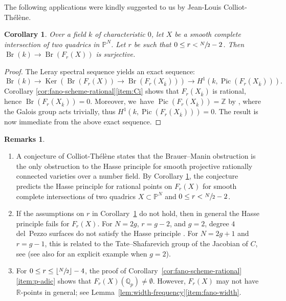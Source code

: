 \documentclass[JEP,XML,SOM,Unicode,NoEqCountersInSection,published]{cedram}
\let\bb\mathbb\let\Bbb\mathbb
\theoremstyle{plain}
\newtheorem{cor}[thm]{Corollary}
\theoremstyle{definition}
\newtheorem{rems}[thm]{Remarks}
\DeclareMathOperator{\Br}{Br}
\DeclareMathOperator\Ker{Ker}
\DeclareMathOperator{\Pic}{Pic}
\newcommand{\kbar}{{\overline{k}}}
\renewcommand\P{\mathbb{P}}
\newcommand\Z{\mathbb{Z}}
\begin{document}
The following applications were kindly suggested to us by Jean-Louis Colliot-Thélène.

\begin{cor}\label{cor:brauer-surjective}
Over a field $k$ of characteristic $0$, let $X$ be a smooth complete intersection of two quadrics in $\P^N$.
Let $r$ be such that $0\leq r<\sfrac{N}{2}-2$.
Then $\Br(k)\to \Br(F_r(X))$ is surjective.
\end{cor}

\begin{proof}
The Leray spectral sequence yields an exact sequence:
\[
\Br(k)\to \Ker(\Br(F_r(X))\to \Br(F_r(X_{\kbar})))\to H^1(k,\Pic(F_r(X_\kbar))).
\]
Corollary \ref{cor:fano-scheme-rational}\eqref{item:Ci} shows that $F_r(X_{\kbar})$ is rational, hence $\Br(F_r(X_{\kbar}))=0$.
Moreover, we~have $\Pic(F_r(X_{\kbar}))=\Z$ by \cite[Cor.\,3.5]{DebarreManivel98}, where the Galois group acts trivially, thus $H^1(k,\Pic(F_r(X_\kbar)))=0$.
The result is now immediate from the above exact sequence.
\end{proof}

\skpt
\begin{rems}\label{CT-remark}
\begin{enumerate}
\item A conjecture of Colliot-Thélène states that the Brauer--Manin obstruction is the only obstruction to the Hasse principle for smooth projective rationally connected varieties over a number field.
By Corollary \ref{cor:brauer-surjective}, the conjecture predicts the Hasse principle for rational points on $F_r(X)$ for smooth complete intersections of two quadrics $X\subset \P^N$ and $0\leq r<\sfrac{N}{2}-2$.
\item
If the assumptions on \(r\) in Corollary~\ref{cor:brauer-surjective} do not hold, then in general the Hasse principle fails for \(F_r(X)\). For \(N=2g\), \(r=g-2\), and \(g=2\), degree $4$ del~Pezzo surfaces do not satisfy the Hasse principle \cite{BSD-dP4}. For \(N=2g+1\) and \(r=g-1\), this is related to the Tate--Shafarevich group of the Jacobian of \(C\), see \cite[\S 8]{BGW} (see also \cite{FreiJi} for an explicit example when \(g=2\)).
\item
For \(0\leq r\leq \lfloor\sfrac{N}{2}\rfloor -4\), the proof of Corollary~\ref{cor:fano-scheme-rational}\eqref{item:p-adic} shows that \(F_r(X)(\bb Q_p)\neq\emptyset\). However, \(F_r(X)\) may not have \(\bb R\)-points in general; see Lemma~\ref{lem:width-frequency}\eqref{item:fano-width}.
\end{enumerate}
\end{rems}
\end{document}
